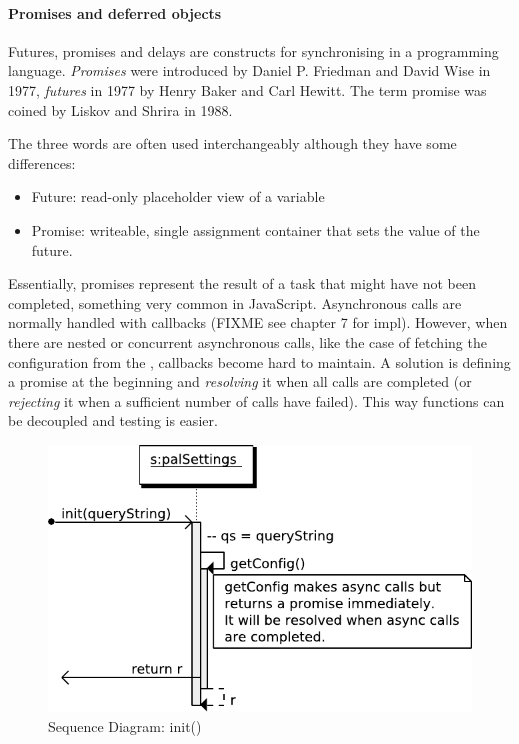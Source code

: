 \paragraph{Promises and deferred objects} Futures, promises and delays are constructs for synchronising in a programming language.
\textit{Promises} were introduced by Daniel P. Friedman and David Wise in 1977, \textit{futures} in 1977 by Henry Baker and Carl Hewitt.
The term promise was coined by Liskov and Shrira \cite{Liskov:1988} in 1988.

The three words are often used interchangeably although they have some differences:
\begin{itemize}
\item Future: read-only placeholder view of a variable
\item Promise: writeable, single assignment container that sets the value of the future.
\end{itemize}
Essentially, promises represent the result of a task that might have not been completed, something very common in JavaScript.
Asynchronous calls are normally handled with callbacks (FIXME see chapter 7 for impl).
However, when there are nested or concurrent asynchronous calls, like the case of fetching the configuration from the \flangobe , callbacks become hard to maintain.
A solution is defining a promise at the beginning and \emph{resolving} it when all calls are completed (or \emph{rejecting} it when a sufficient number of calls have failed).
This way functions can be decoupled and testing is easier. 

\begin{figure}[htb]
    \centering
    \includegraphics{figures/design/seqdia/palSettings-init.pdf}
    \caption{Sequence Diagram: init()}
    \label{fig:design-seqdia-palSettings-init}
\end{figure}

